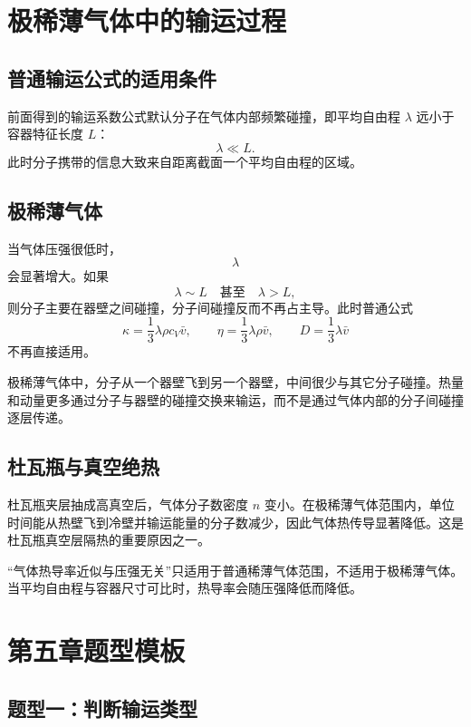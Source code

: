 \section{极稀薄气体中的输运过程}

\subsection{普通输运公式的适用条件}

前面得到的输运系数公式默认分子在气体内部频繁碰撞，即平均自由程 \(\lambda\) 远小于容器特征长度 \(L\)：
\[
  \lambda\ll L.
\]
此时分子携带的信息大致来自距离截面一个平均自由程的区域。

\subsection{极稀薄气体}

当气体压强很低时，
\[
  \lambda
\]
会显著增大。如果
\[
  \lambda\sim L
  \quad \text{甚至} \quad
  \lambda>L,
\]
则分子主要在器壁之间碰撞，分子间碰撞反而不再占主导。此时普通公式
\[
  \kappa=\frac13\lambda\rho c_V\bar v,
  \qquad
  \eta=\frac13\lambda\rho\bar v,
  \qquad
  D=\frac13\lambda\bar v
\]
不再直接适用。

\begin{KeyBox}[极稀薄气体的物理图像]
极稀薄气体中，分子从一个器壁飞到另一个器壁，中间很少与其它分子碰撞。热量和动量更多通过分子与器壁的碰撞交换来输运，而不是通过气体内部的分子间碰撞逐层传递。
\end{KeyBox}

\subsection{杜瓦瓶与真空绝热}

杜瓦瓶夹层抽成高真空后，气体分子数密度 \(n\) 变小。在极稀薄气体范围内，单位时间能从热壁飞到冷壁并输运能量的分子数减少，因此气体热传导显著降低。这是杜瓦瓶真空层隔热的重要原因之一。

\begin{WarnBox}[普通压强无关结论有范围]
“气体热导率近似与压强无关”只适用于普通稀薄气体范围，不适用于极稀薄气体。当平均自由程与容器尺寸可比时，热导率会随压强降低而降低。
\end{WarnBox}

\section{第五章题型模板}

\subsection{题型一：判断输运类型}

